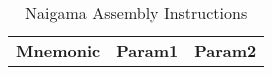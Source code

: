 
\begin{table}[]
\centering
\caption{Naigama Assembly Instructions}
\label{tab:naig_assembly}
\begin{tabular}{lll}
\textbf{Mnemonic} & \textbf{Param1} & \textbf{Param2} \\
\end{tabular}
\end{table}
